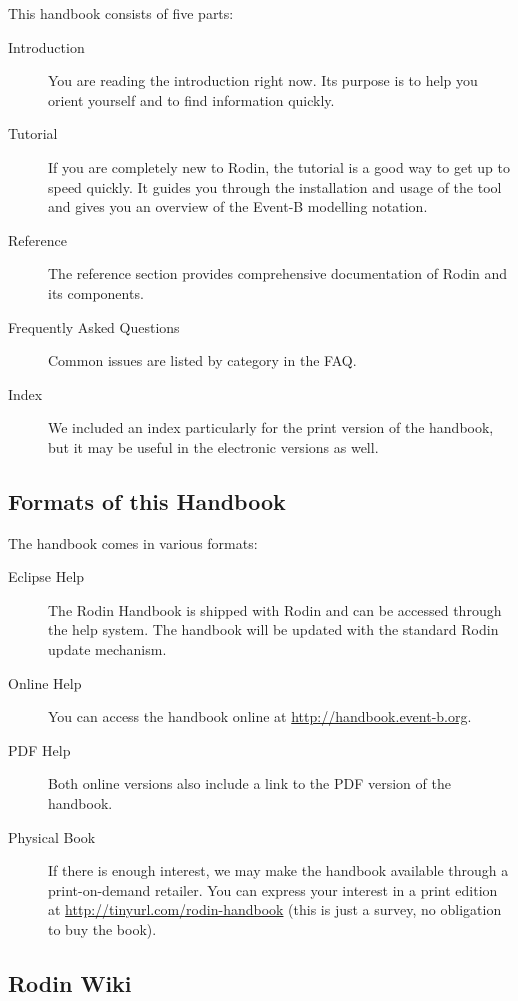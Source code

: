\documentclass[12pt]{book}
\begin{document}
This handbook consists of five parts:

\begin{description}
	\item[Introduction] You are reading the introduction right now.  Its purpose is to help you orient yourself and to find information quickly.
	\item[Tutorial] If you are completely new to Rodin, the tutorial is a good way to get up to speed quickly.  It guides you through the installation and usage of the tool and gives you an overview of the Event-B modelling notation.
	\item[Reference] The reference section provides comprehensive documentation of Rodin and its components.
	\item[Frequently Asked Questions] Common issues are listed by category in the FAQ.
	\item[Index] We included an index particularly for the print version of the handbook, but it may be useful in the electronic versions as well.  
\end{description}

\subsection{Formats of this Handbook}
\label{handbook_formats}

The handbook comes in various formats:

\begin{description}
	\item[Eclipse Help] The Rodin Handbook is shipped with Rodin and can be accessed through the help system.  The handbook will be updated with the standard Rodin update mechanism.
	\item[Online Help] You can access the handbook online at \url{http://handbook.event-b.org}.
	\item[PDF Help] Both online versions also include a link to the PDF version of the handbook.
	\item[Physical Book] If there is enough interest, we may make the handbook available through a print-on-demand retailer.  You can express your interest in a print edition at \url{http://tinyurl.com/rodin-handbook} (this is just a survey, no obligation to buy the book).
\end{description}

\subsection{Rodin Wiki}
\label{rodin_wiki}
\end{document}

